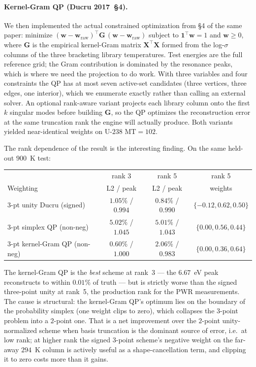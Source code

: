 \paragraph{Kernel-Gram QP (Ducru 2017~§4).}
We then implemented the actual constrained optimization from
§4 of the same paper: minimize
$(\mathbf{w} - \mathbf{w}_\text{raw})^\top \mathbf{G}\,
(\mathbf{w} - \mathbf{w}_\text{raw})$ subject to
$\mathbf{1}^\top \mathbf{w} = 1$ and $\mathbf{w} \geq 0$,
where $\mathbf{G}$ is the empirical kernel-Gram matrix
$\mathbf{X}^\top \mathbf{X}$ formed from the log-$\sigma$
columns of the three bracketing library temperatures. Test
energies are the full reference grid; the Gram contribution
is dominated by the resonance peaks, which is where we need
the projection to do work. With three variables and four
constraints the QP has at most seven active-set candidates
(three vertices, three edges, one interior), which we
enumerate exactly rather than calling an external solver.
An optional rank-aware variant projects each library column
onto the first $k$ singular modes before building $\mathbf{G}$,
so the QP optimizes the reconstruction error at the same
truncation rank the engine will actually produce. Both
variants yielded near-identical weights on U-$238$ MT$=102$.

The rank dependence of the result is the interesting finding.
On the same held-out $900$~K test:

\begin{table}[t]
\centering
\small
\begin{tabular}{@{}lccc@{}}
\toprule
 & rank 3 & rank 5 & rank 5 \\
Weighting & L2 / peak & L2 / peak & weights \\
\midrule
$3$-pt unity Ducru (signed) &
 $1.05\%$ / $0.994$ &
 $\mathbf{0.84\%}$ / $\mathbf{0.990}$ &
 $\{-0.12, 0.62, 0.50\}$ \\
$3$-pt simplex QP (non-neg) &
 $5.02\%$ / $1.045$ &
 $5.01\%$ / $1.043$ &
 $\{0.00, 0.56, 0.44\}$ \\
$3$-pt kernel-Gram QP (non-neg) &
 $\mathbf{0.60\%}$ / $\mathbf{1.000}$ &
 $2.06\%$ / $0.983$ &
 $\{0.00, 0.36, 0.64\}$ \\
\bottomrule
\end{tabular}
\end{table}

The kernel-Gram QP is the \emph{best} scheme at rank~3 — the
$6.67$~eV peak reconstructs to within $0.01\%$ of truth --- but
is strictly worse than the signed three-point unity at
rank~5, the production rank for the PWR measurements. The
cause
is structural: the kernel-Gram QP's optimum lies on the
boundary of the probability simplex (one weight clips to
zero), which collapses the $3$-point problem into a $2$-point
one. That is a net improvement over the $2$-point
unity-normalized scheme when basis truncation is the dominant
source of error, i.e.\ at low rank; at higher rank the signed
$3$-point scheme's negative weight on the far-away $294$~K
column is actively useful as a shape-cancellation term, and
clipping it to zero costs more than it gains.

